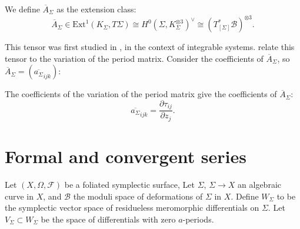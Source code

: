     \begin{defn}  We define \(\overline{A}_\Sigma\) as the extension class:
    \[ \overline{A}_\Sigma \in\mathrm{Ext}^1(K_\Sigma,T \Sigma) \cong H^0(\Sigma,K_\Sigma^{\otimes 3})^\vee\cong \left(T^*_{[\Sigma]}\mathcal{B} \right)^{\otimes 3}.\]
    \end{defn}
    
    This tensor was first studied in \cite{domacubic}, in the context of integrable systems. \cite{bhuespe} relate this tensor to the variation of the period matrix. Consider the coefficients of \( \overline{A}_\Sigma\), so \( \overline{A}_\Sigma = (\overline{a_\Sigma}_{ijk})\):
    
    \begin{lem} 
    \label{lem:cubic}
    The coefficients of the variation of the period matrix give the coefficients of \( \overline{A}_\Sigma\):
    \[\overline{a_\Sigma}_{ijk} = \frac{\partial \tau_{ij}}{\partial z_j} . \]
    \end{lem}

    
    \section{Formal and convergent series}
    \label{sec:formaltheta}
    
    Let \((X,\Omega,\mathcal{F})\) be a foliated symplectic surface, Let \(\Sigma\), \( \Sigma \rightarrow X\) an algebraic curve in \(X\), and \( \mathcal{B}\) the moduli space of deformations of \( \Sigma \) in \(X\). Define \(W_\Sigma\) to be the symplectic vector space of residueless meromorphic differentials on \(\Sigma\). Let \(V_\Sigma \subset W_\Sigma\) be the space of differentials with zero \(a\)-periods.
    

